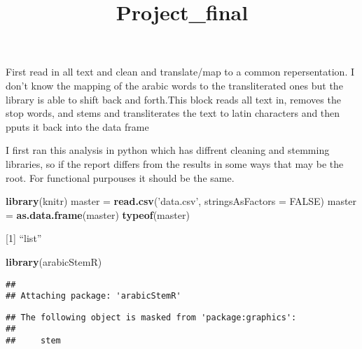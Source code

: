\documentclass[]{article}
\title{Project\_final}
\author{}
\date{}
\newenvironment{Shaded}{\begin{snugshade}}{\end{snugshade}}
\newcommand{\ControlFlowTok}[1]{\textcolor[rgb]{0.13,0.29,0.53}{\textbf{#1}}}
\newcommand{\DataTypeTok}[1]{\textcolor[rgb]{0.13,0.29,0.53}{#1}}
\newcommand{\DecValTok}[1]{\textcolor[rgb]{0.00,0.00,0.81}{#1}}
\newcommand{\KeywordTok}[1]{\textcolor[rgb]{0.13,0.29,0.53}{\textbf{#1}}}
\newcommand{\NormalTok}[1]{#1}
\newcommand{\OperatorTok}[1]{\textcolor[rgb]{0.81,0.36,0.00}{\textbf{#1}}}
\newcommand{\OtherTok}[1]{\textcolor[rgb]{0.56,0.35,0.01}{#1}}
\newcommand{\StringTok}[1]{\textcolor[rgb]{0.31,0.60,0.02}{#1}}
\begin{document}
\maketitle

First read in all text and clean and translate/map to a common
repersentation. I don't know the mapping of the arabic words to the
transliterated ones but the library is able to shift back and forth.This
block reads all text in, removes the stop words, and stems and
transliterates the text to latin characters and then pputs it back into
the data frame

I first ran this analysis in python which has diffrent cleaning and
stemming libraries, so if the report differs from the results in some
ways that may be the root. For functional purpouses it should be the
same.

\begin{Shaded}
\begin{Highlighting}[]
\KeywordTok{library}\NormalTok{(knitr)}
\NormalTok{master =}\StringTok{ }\KeywordTok{read.csv}\NormalTok{(}\StringTok{'data.csv'}\NormalTok{, }\DataTypeTok{stringsAsFactors =} \OtherTok{FALSE}\NormalTok{)}
\NormalTok{master =}\StringTok{ }\KeywordTok{as.data.frame}\NormalTok{(master)}
\KeywordTok{typeof}\NormalTok{(master)}
\end{Highlighting}
\end{Shaded}

{[}1{]} ``list''

\begin{Shaded}
\begin{Highlighting}[]
\KeywordTok{library}\NormalTok{(arabicStemR)}
\end{Highlighting}
\end{Shaded}

\begin{verbatim}
## 
## Attaching package: 'arabicStemR'
\end{verbatim}

\begin{verbatim}
## The following object is masked from 'package:graphics':
## 
##     stem
\end{verbatim}

\begin{Shaded}
\end{Shaded}
\end{document}

